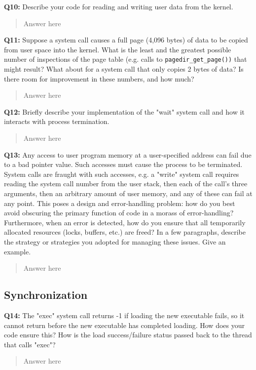 \documentclass[a4paper,11pt]{paper}
\begin{document}
\textbf{Q10:} Describe your code for reading and writing user data from the kernel.
\begin{quote}
  Answer here
\end{quote}

\textbf{Q11:} Suppose a system call causes a full page (4,096 bytes) of data to be copied from user space into the kernel.  What is the least and the greatest possible number of inspections of the page table (e.g. calls to \texttt{pagedir\_get\_page())} that might result?  What about for a system call that only copies 2 bytes of data?  Is there room for improvement in these numbers, and how much?
\begin{quote}
  Answer here
\end{quote}

\textbf{Q12:} Briefly describe your implementation of the "wait" system call and how it interacts with process termination.
\begin{quote}
  Answer here
\end{quote}

\textbf{Q13:} Any access to user program memory at a user-specified address can fail due to a bad pointer value.  Such accesses must cause the process to be terminated.  System calls are fraught with such accesses, e.g. a "write" system call requires reading the system call number from the user stack, then each of the call's three arguments, then an arbitrary amount of user memory, and any of these can fail at any point.  This poses a design and error-handling problem: how do you best avoid obscuring the primary function of code in a morass of error-handling?  Furthermore, when an error is detected, how do you ensure that all temporarily allocated resources (locks, buffers, etc.) are freed?  In a few paragraphs, describe the strategy or strategies you adopted for managing these issues.  Give an example.
\begin{quote}
  Answer here
\end{quote}

\subsection{Synchronization}

\textbf{Q14:} The "exec" system call returns -1 if loading the new executable fails, so it cannot return before the new executable has completed loading.  How does your code ensure this?  How is the load success/failure status passed back to the thread that calls "exec"?
\begin{quote}
  Answer here
\end{quote}
\end{document}
